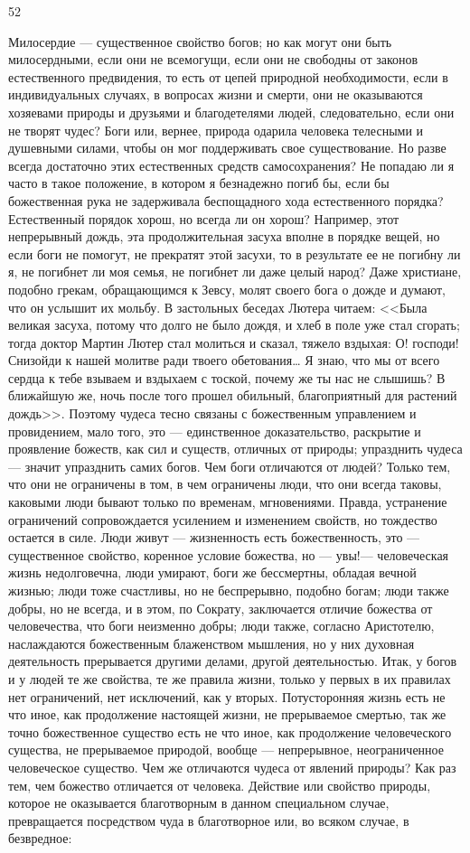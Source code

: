 \documentclass[12pt]{article}
\begin{document}
52

Милосердие --- существенное свойство богов; но как могут они быть милосердными, если они не всемогущи, если они не свободны от законов естественного предвидения, то есть от цепей природной необходимости, если в индивидуальных случаях, в вопросах жизни и смерти, они не оказываются хозяевами природы и друзьями и благодетелями людей, следовательно, если они не творят чудес? Боги или, вернее, природа одарила человека телесными и душевными силами, чтобы он мог поддерживать свое существование. Но разве всегда достаточно этих естественных средств самосохранения? Не попадаю ли я часто в такое положение, в котором я безнадежно погиб бы, если бы божественная рука не задерживала беспощадного хода естественного порядка? Естественный порядок хорош, но всегда ли он хорош? Например, этот непрерывный дождь, эта продолжительная засуха вполне в порядке вещей, но если боги не помогут, не прекратят этой засухи, то в результате ее не погибну ли я, не погибнет ли моя семья, не погибнет ли даже целый народ? Даже христиане, подобно грекам, обращающимся к Зевсу, молят своего бога о дожде и думают, что он услышит их мольбу. В застольных беседах Лютера читаем: <<Была великая засуха, потому что долго не было дождя, и хлеб в поле уже стал сгорать; тогда доктор Мартин Лютер стал молиться и сказал, тяжело вздыхая: О! господи! Снизойди к нашей молитве ради твоего обетования… Я знаю, что мы от всего сердца к тебе взываем и вздыхаем с тоской, почему же ты нас не слышишь? В ближайшую же, ночь после того прошел обильный, благоприятный для растений дождь>>. Поэтому чудеса тесно связаны с божественным управлением и провидением, мало того, это --- единственное доказательство, раскрытие и проявление божеств, как сил и существ, отличных от природы; упразднить чудеса --- значит упразднить самих богов. Чем боги отличаются от людей? Только тем, что они не ограничены в том, в чем ограничены люди, что они всегда таковы, каковыми люди бывают только по временам, мгновениями. Правда, устранение ограничений сопровождается усилением и изменением свойств, но тождество остается в силе. Люди живут --- жизненность есть божественность, это --- существенное свойство, коренное условие божества, но --- увы!--- человеческая жизнь недолговечна, люди умирают, боги же бессмертны, обладая вечной жизнью; люди тоже счастливы, но не беспрерывно, подобно богам; люди также добры, но не всегда, и в этом, по Сократу, заключается отличие божества от человечества, что боги неизменно добры; люди также, согласно Аристотелю, наслаждаются божественным блаженством мышления, но у них духовная деятельность прерывается другими делами, другой деятельностью. Итак, у богов и у людей те же свойства, те же правила жизни, только у первых в их правилах нет ограничений, нет исключений, как у вторых. Потусторонняя жизнь есть не что иное, как продолжение настоящей жизни, не прерываемое смертью, так же точно божественное существо есть не что иное, как продолжение человеческого существа, не прерываемое природой, вообще --- непрерывное, неограниченное человеческое существо. Чем же отличаются чудеса от явлений природы? Как раз тем, чем божество отличается от человека. Действие или свойство природы, которое не оказывается благотворным в данном специальном случае, превращается посредством чуда в благотворное или, во всяком случае, в безвредное:
\end{document}
